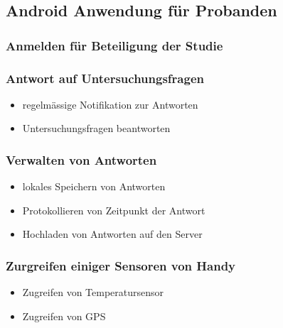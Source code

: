 \documentclass[a4paper]{scrreprt}
\begin{document}
            \subsection{Android Anwendung f\"ur Probanden}
                \vspace*{0.2cm}

                \subsubsection{Anmelden f\"ur Beteiligung der Studie}
                
                \subsubsection{Antwort auf Untersuchungsfragen}
                    \begin{itemize}
                        \item regelm\"assige Notifikation zur Antworten
                        \item Untersuchungsfragen beantworten
                    \end{itemize}
                
                \subsubsection{Verwalten von Antworten}
                    \begin{itemize}
                        \item lokales Speichern von Antworten
                        \item Protokollieren von Zeitpunkt der Antwort
                        \item Hochladen von Antworten auf den Server
                    \end{itemize}

                \subsubsection{Zurgreifen einiger Sensoren von Handy}
                    \begin{itemize}
                        \item Zugreifen von Temperatursensor
                        \item Zugreifen von GPS
                    \end{itemize}
                \vspace*{0.5cm}
\end{document}

